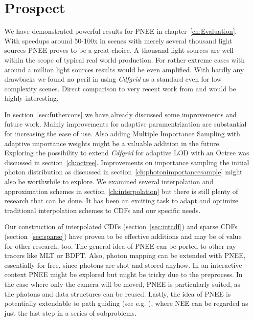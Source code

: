 \chapter{Prospect}
\label{ch:Prospect}

We have demonstrated powerful results for PNEE in chapter~\ref{ch:Evaluation}. With speedups around 50-100x in scenes with merely several thousand light sources PNEE proves to be a great choice. A thousand light sources are well within the scope of typical real world production. For rather extreme cases with around a million light sources results would be even amplified. With hardly any drawbacks we found no peril in using \textit{Cdfgrid} as a standard even for low complexity scenes. Direct comparison to very recent work from \textcite{Vevoda:2018:BOR} and \textcite{Estevez} would be highly interesting.

In section~\ref{sec:futhercons} we have already discussed some improvements and future work. Mainly improvements for adaptive paramentrization are substantial for increasing the ease of use. Also adding Multiple Importance Sampling with adaptive importance weights might be a valuable addition in the future. Exploring the possibility to extend \textit{Cdfgrid} for adaptive LOD with an Octree was discussed in section~\ref{ch:octree}. Improvements on importance sampling the initial photon distribution as discussed in section~\ref{ch:photonimportancesample} might also be worthwhile to explore. We examined several interpolation and approximation schemes in section~\ref{ch:interpolation} but there is still plenty of research that can be done. It has been an exciting task  to adapt and optimize traditional interpolation schemes to CDFs and our specific needs. 

Our construction of interpolated CDFs (section~\ref{sec:intcdf}) and sparse CDFs (section~\ref{sec:sparse}) have proven to be effective additions and may be of value for other research, too. The general idea of PNEE can be ported to other ray tracers like MLT or BDPT. Also, photon mapping can be extended with PNEE, essentially for free, since photons are shot and stored anyhow. In an interactive context PNEE might be explored but might be tricky due to the preprocess. In the case where only the camera will be moved, PNEE is particularly suited, as the photons and data structures can be reused. Lastly, the idea of PNEE is potentially extendable to path guiding (see e.g. \parencite{DBLP:journals/cgf/MullerGN17}), where NEE can be regarded as just the last step in a series of subproblems.

